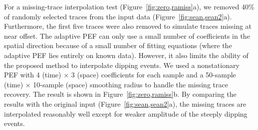 


For a missing-trace interpolation test
(Figure~\ref{fig:zero,ramiss}a), we removed 40\% of randomly selected
traces from the input data
(Figure~\ref{fig:sean,sean2}a). Furthermore, the first five traces
were also removed to simulate traces missing at near offset. The
adaptive PEF can only use a small number of coefficients in the
spatial direction because of a small number of fitting equations
(where the adaptive PEF lies entirely on known data). However, it also
limits the ability of the proposed method to interpolate dipping
events. We used a nonstationary PEF with 4 (time) $\times$ 3 (space)
coefficients for each sample and a 50-sample (time) $\times$ 10-sample
(space) smoothing radius to handle the missing trace recovery. The
result is shown in Figure~\ref{fig:zero,ramiss}b. By comparing the
results with the original input (Figure~\ref{fig:sean,sean2}a), the
missing traces are interpolated reasonably well except for weaker
amplitude of the steeply dipping events.




